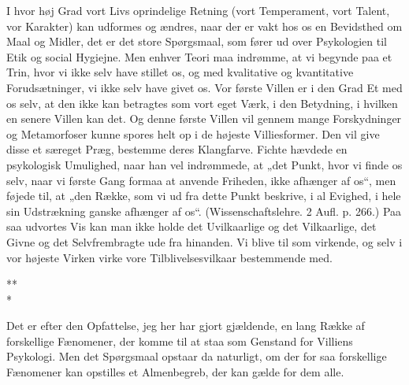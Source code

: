 \documentclass[12pt,a4paper,openany]{book}
\newcommand{\opage}[1]{\marginnote{\footnotesize\textit{[#1]}}}
\newcommand{\stjerner}{\begin{center}*\hspace{0.4em}*\\[-0.9ex]*\end{center}}   %
\begin{document}
\setcounter{footnote}{0}%
\opage{43}I hvor høj Grad vort Livs oprindelige Retning (vort Temperament,
vort Talent, vor Karakter) kan udformes og ændres,
naar der er vakt hos os en Bevidsthed om Maal og Midler,
det er det store Spørgsmaal, som fører ud over Psykologien
til Etik og social Hygiejne. Men enhver Teori maa indrømme,
at vi begynde paa et Trin, hvor vi ikke selv have stillet os,
og med kvalitative og kvantitative Forudsætninger, vi ikke selv
have givet os. Vor første Villen er i den Grad Et med os selv,
at den ikke kan betragtes som vort eget Værk, i den Betydning,
i hvilken en senere Villen kan det. Og denne første
Villen vil gennem mange Forskydninger og Metamorfoser kunne
spores helt op i de højeste Villiesformer. Den vil give disse
et særeget Præg, bestemme deres Klangfarve. Fichte hævdede
en psykologisk Umulighed, naar han vel indrømmede, at „det
Punkt, hvor vi finde os selv, naar vi første Gang formaa at
anvende Friheden, ikke afhænger af os“, men føjede til, at
„den Række, som vi ud fra dette Punkt beskrive, i al Evighed,
i hele sin Udstrækning ganske afhænger af os“. (Wissenschaftslehre.
2 Aufl. p. 266.) Paa saa udvortes Vis kan man ikke
holde det Uvilkaarlige og det Vilkaarlige, det Givne og det
Selvfrembragte ude fra hinanden. Vi blive til som virkende,
og selv i vor højeste Virken virke vore Tilblivelsesvilkaar bestemmende
med.

\stjerner

Det er efter den Opfattelse, jeg her har gjort gjældende,
en lang Række af forskellige Fænomener, der komme til at
staa som Genstand for Villiens Psykologi. Men det Spørgsmaal
opstaar da naturligt, om der for saa forskellige Fænomener kan
opstilles et Almenbegreb, der kan gælde for dem alle.
\end{document}
